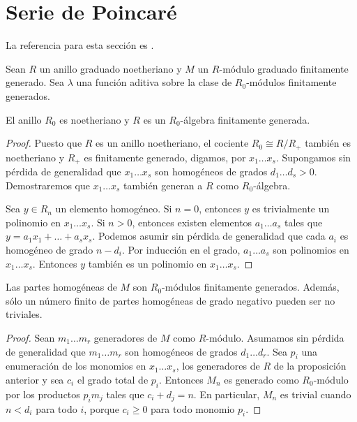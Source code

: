 \section{Serie de Poincaré}

\noindent La referencia para esta sección es \cite[pp. 106, 116-117]{atiyah}.

\begin{preliminaries}
Sean $R$ un anillo graduado noetheriano y $M$ un $R$-módulo graduado finitamente generado. Sea $\lambda$ una función aditiva sobre la clase de $R_0$-módulos finitamente generados.
\end{preliminaries}

\begin{proposition}
El anillo $R_0$ es noetheriano y $R$ es un $R_0$-álgebra finitamente generada.
\end{proposition}

\begin{proof}
Puesto que $R$ es un anillo noetheriano, el cociente $R_0 \cong R/R_+$ también es noetheriano y $R_+$ es finitamente generado, digamos, por $x_1 \dots x_s$. Supongamos sin pérdida de generalidad que $x_1 \dots x_s$ son homogéneos de grados $d_1 \dots d_s > 0$. Demostraremos que $x_1 \dots x_s$ también generan a $R$ como $R_0$-álgebra.

Sea $y \in R_n$ un elemento homogéneo. Si $n = 0$, entonces $y$ es trivialmente un polinomio en $x_1 \dots x_s$. Si $n > 0$, entonces existen elementos $a_1 \dots a_s$ tales que $y = a_1 x_1 + \dots + a_s x_s$. Podemos asumir sin pérdida de generalidad que cada $a_i$ es homogéneo de grado $n - d_i$. Por inducción en el grado, $a_1 \dots a_s$ son polinomios en $x_1 \dots x_s$. Entonces $y$ también es un polinomio en $x_1 \dots x_s$.
\end{proof}

\begin{proposition}
Las partes homogéneas de $M$ son $R_0$-módulos finitamente generados. Además, sólo un número finito de partes homogéneas de grado negativo pueden ser no triviales.
\end{proposition}

\begin{proof}
Sean $m_1 \dots m_r$ generadores de $M$ como $R$-módulo. Asumamos sin pérdida de generalidad que $m_1 \dots m_r$ son homogéneos de grados $d_1 \dots d_r$. Sea $p_i$ una enumeración de los monomios en $x_1 \dots x_s$, los generadores de $R$ de la proposición anterior y sea $c_i$ el grado total de $p_i$. Entonces $M_n$ es generado como $R_0$-módulo por los productos $p_i m_j$ tales que $c_i + d_j = n$. En particular, $M_n$ es trivial cuando $n < d_i$ para todo $i$, porque $c_i \ge 0$ para todo monomio $p_i$.
\end{proof}


